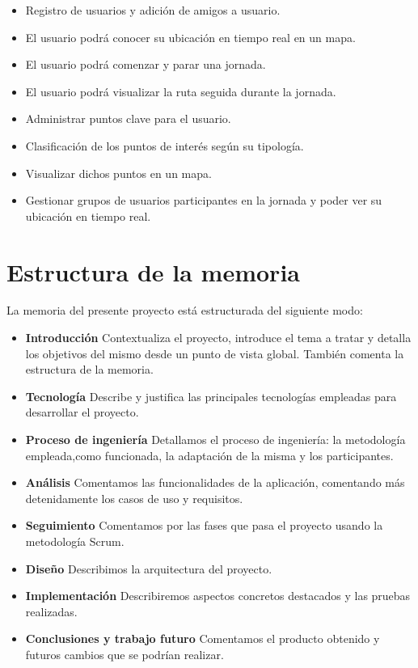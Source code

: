 \begin{itemize}
\item Registro de usuarios y adición de amigos a usuario.
\item El usuario podrá conocer su ubicación en tiempo real en un mapa.
\item El usuario podrá comenzar y parar una jornada.
\item El usuario podrá visualizar la ruta seguida durante la jornada.
\item Administrar puntos clave para el usuario.
\item Clasificación de los puntos de interés según su tipología.
\item Visualizar dichos puntos en un mapa.
\item Gestionar grupos de usuarios participantes en la jornada y poder ver su ubicación en tiempo
real.

\end{itemize}


\section{Estructura de la memoria}
La memoria del presente proyecto está estructurada del siguiente modo:

\begin{itemize}
\item \textbf{Introducción} Contextualiza el proyecto, introduce el tema a tratar y detalla los objetivos del mismo desde un punto de vista global.
 También comenta la estructura de la memoria.

\item \textbf{Tecnología} Describe y justifica las principales tecnologías empleadas para desarrollar el proyecto.



\item \textbf{Proceso de ingeniería} Detallamos el proceso de ingeniería: la metodología empleada,como funcionada, la adaptación de la misma y los participantes.


\item \textbf{Análisis} Comentamos las funcionalidades de la aplicación, comentando más detenidamente los casos de uso y requisitos. 
\item \textbf{Seguimiento} Comentamos por las fases que pasa el proyecto usando la metodología Scrum.
\item \textbf{Diseño} Describimos la arquitectura del proyecto.
\item \textbf{Implementación} Describiremos aspectos concretos destacados y las pruebas realizadas.





\item \textbf{Conclusiones y trabajo futuro}
Comentamos el producto obtenido y futuros cambios que se podrían realizar.



\end{itemize}


